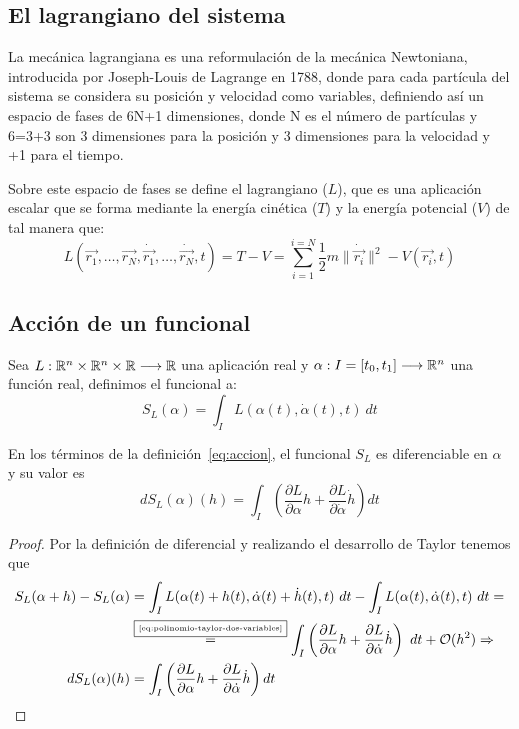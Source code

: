 \subsection{El lagrangiano del sistema}

La mecánica lagrangiana es una reformulación de la mecánica Newtoniana, introducida por Joseph-Louis de Lagrange en 1788, donde para cada partícula del sistema se considera su posición y velocidad como variables, definiendo así un espacio de fases de 6N+1 dimensiones, donde N es el número de partículas y 6=3+3 son 3 dimensiones para la posición y 3 dimensiones para la velocidad y +1 para el tiempo.

Sobre este espacio de fases se define el lagrangiano ($L$), que es una aplicación escalar que se forma mediante la energía cinética ($T$) y la energía potencial ($V$) de tal manera que:
\begin{equation}
	\label{eq:lagrangiano_clasico}
	L(\vec{r_1},\dots,\vec{r_N},\dot{\vec{r_1}},\dots,\dot{\vec{r_N}},t)=T-V=\sum\limits_{i=1}^{i=N} \frac{1}{2}m\|\dot{\vec{r_i}}\|^2-V(\vec{r_i},t)
\end{equation}

\subsection{Acción de un funcional}
	Sea $L:\mathbb{R}^n\times\mathbb{R}^n\times\mathbb{R}\longrightarrow \mathbb{R}$ una aplicación real y $\alpha:I=[t_0, t_1]\longrightarrow \mathbb{R}^n$ una función real, definimos el funcional  a:
	\begin{equation}
		\label{eq:accion}
		S_L(\alpha) = \int_{I}L(\alpha(t), \dot{\alpha}(t), t)\ dt
	\end{equation}

\begin{proposition}
	En los términos de la definición~\eqref{eq:accion}, el funcional $S_L$ es diferenciable en $\alpha$ y su valor es
	\begin{equation}
		\label{eq:accion_diferencial}
		dS_L(\alpha)(h)=\int_{I}\left( \frac{\partial L}{\partial\alpha}h+\frac{\partial L}{\partial\dot{\alpha}}\dot{h}\right) dt
	\end{equation}
\end{proposition}
\begin{proof}
	Por la definición de diferencial y realizando el desarrollo de Taylor tenemos que
	\begin{equation*}
		\begin{split}
			S_L(\alpha + h) -  S_L(\alpha)& = \int_{I}L(\alpha(t)+h(t), \dot{\alpha}(t)+\dot{h}(t), t)\ dt - \int_{I}L(\alpha(t), \dot{\alpha}(t), t)\ dt =\\
			&\overset{\fbox{\tiny \ref{eq:polinomio-taylor-dos-variables}}}{=}\int_{I}\left( \frac{\partial L}{\partial\alpha}h+\frac{\partial L}{\partial\dot{\alpha}}\dot{h}\right)\ dt+\mathcal{O}(h^2)\Rightarrow\\
			dS_L(\alpha)(h) &=\int_{I}\left( \frac{\partial L}{\partial\alpha}h+\frac{\partial L}{\partial\dot{\alpha}}\dot{h}\right) dt
		\end{split}
	\end{equation*}
\end{proof}


